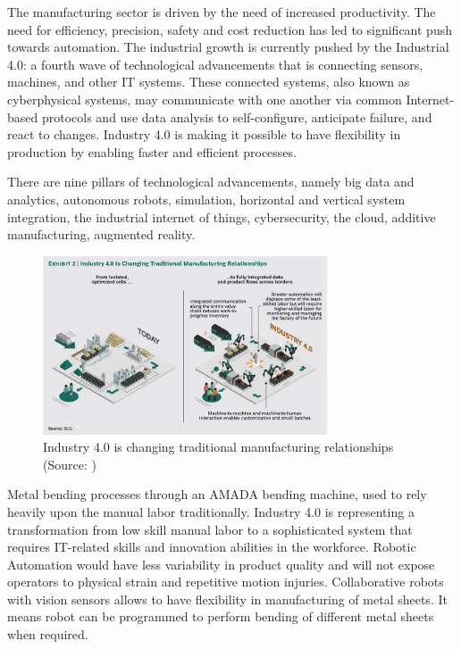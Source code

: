 The manufacturing sector is driven by the need of increased productivity. The need
for efficiency, precision, safety and cost reduction has led to significant push towards
automation. The industrial growth is currently pushed by the Industrial 4.0: a fourth wave
of technological advancements that is connecting sensors, machines, and other
IT systems. These connected systems, also known as cyberphysical systems, may communicate with one 
another via common Internet-based protocols and use data analysis to self-configure, anticipate 
failure, and react to changes. Industry 4.0 is making it possible to have
flexibility in production by enabling faster and efficient processes. \cite{BAI2020107776,russmann2015industry}

There are nine pillars of technological advancements, namely big data and analytics, autonomous robots, simulation,
horizontal and vertical system integration, the industrial internet of things,
cybersecurity, the cloud, additive manufacturing, augmented reality. \cite{russmann2015industry}


\begin{figure}[h]
    \centering
    \includegraphics[width=0.75\textwidth]{1. Introduction/1.1 Background/exhibit2.png}
    \caption{Industry 4.0 is changing traditional manufacturing relationships (Source: \cite{russmann2015industry})}
    \label{fig:background-exhibit-2}
\end{figure}

Metal bending processes through an AMADA bending machine, used to rely heavily upon the
manual labor traditionally. Industry 4.0 is representing a transformation
from low skill manual labor to a sophisticated system that requires IT-related skills
and innovation abilities in the workforce. Robotic Automation would have less variability in product
quality and will not expose operators to physical strain and repetitive motion injuries. Collaborative robots
with vision sensors \cite{8361333} allows to have flexibility in manufacturing of metal sheets.
It means robot can be programmed to perform bending of different metal sheets when required. \cite{kassowrobotsblog}
